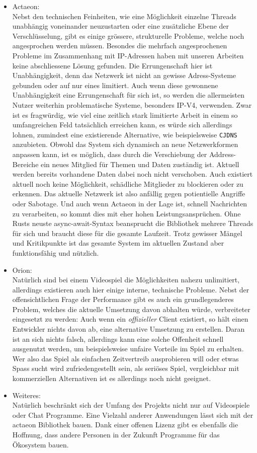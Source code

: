\documentclass[a4paper,11pt,titlepage,twoside]{memoir}
\begin{document}
\begin{itemize}
\item Actaeon: \\
Nebst den technischen Feinheiten, wie eine Möglichkeit einzelne
Threads unabhängig voneinander neuzustarten oder eine zusätzliche
Ebene der Verschlüsselung, gibt es einige grössere, strukturelle
Probleme, welche noch angesprochen werden müssen. Besondes die
mehrfach angesprochenen Probleme im Zusammenhang mit IP-Adressen
haben mit unseren Arbeiten keine abschliessene Lösung gefunden. Die
Errungenschaft hier ist Unabhängigkeit, denn das Netzwerk ist nicht
an gewisse Adress-Systeme gebunden oder auf nur eines limitiert.
Auch wenn diese gewonnene Unabhängigkeit eine Errungenschaft für
sich ist, so werden die allermeisten Nutzer weiterhin problematische
Systeme, besonders IP-V4, verwenden. Zwar ist es fragwürdig, wie
viel eine zeitlich stark limitierte Arbeit in einem so umfangreichen
Feld tatsächlich erreichen kann, es würde sich allerdings lohnen,
zumindest eine existierende Alternative, wie beispielsweise \texttt{CJDNS}
anzubieten. Obwohl das System sich dynamisch an neue Netzwerkformen
anpassen kann, ist es möglich, dass durch die Verschiebung der
Address-Bereiche ein neues Mitglied für Themen und Daten zuständig
ist. Aktuell werden bereits vorhandene Daten dabei noch nicht
verschoben. Auch existiert aktuell noch keine Möglichkeit,
schädliche Mitglieder zu blockieren oder zu erkennen. Das aktuelle
Netzwerk ist also anfällig gegen potientielle Angriffe oder
Sabotage. Und auch wenn Actaeon in der Lage ist, schnell Nachrichten
zu verarbeiten, so kommt dies mit eher hohen Leistungsansprüchen.
Ohne Rusts neuste async-await-Syntax beansprucht die Bibliothek
mehrere Threads für sich und braucht diese für die gesamte Laufzeit.
Trotz gewisser Mängel und Kritikpunkte ist das gesamte System im
aktuellen Zustand aber funktionsfähig und nützlich.
\item Orion: \\
Natürlich sind bei einem Videospiel die Möglichkeiten nahezu
unlimitiert, allerdings existieren auch hier einige interne,
technische Probleme. Nebst der offensichtlichen Frage der
Performance gibt es auch ein grundlegenderes Problem, welches die
aktuelle Umsetzung davon abhalten würde, verbreiteter eingesetzt zu
werden: Auch wenn ein \emph{offizieller} Client existiert, so hält einen
Entwickler nichts davon ab, eine alternative Umsetzung zu erstellen.
Daran ist an sich nichts falsch, allerdings kann eine solche
Offenheit schnell ausgenutzt werden, um beispielsweise unfaire
Vorteile im Spiel zu erhalten. Wer also das Spiel als einfachen
Zeitvertreib ausprobieren will oder etwas Spass sucht wird
zufriedengestellt sein, als seriöses Spiel, vergleichbar mit
kommerziellen Alternativen ist es allerdings noch nicht geeignet.
\item Weiteres: \\
Natürlich beschränkt sich der Umfang des Projekts nicht nur auf
Videospiele oder Chat Programme. Eine Vielzahl anderer Anwendungen
lässt sich mit der actaeon Bibliothek bauen. Dank einer offenen
Lizenz gibt es ebenfalls die Hoffnung, dass andere Personen in der
Zukunft Programme für das Ökosystem bauen.
\newpage
\end{itemize}
\end{document}
